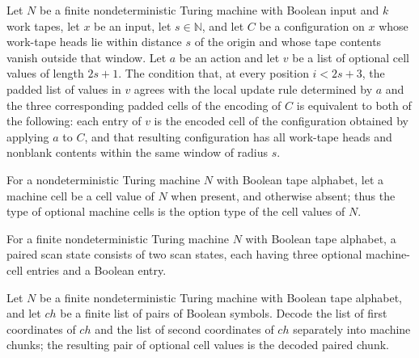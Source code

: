 \begin{theorem}
\label{Complexity.Codec.slide_step_iff}
\leanok
{}
Let $N$ be a finite nondeterministic Turing machine with Boolean input and $k$ work
tapes, let $x$ be an input, let $s\in\mathbb{N}$, and let $C$ be a configuration on $x$
whose work-tape heads lie within distance $s$ of the origin and whose tape contents
vanish outside that window. Let $a$ be an action and let $v$ be a list of optional cell
values of length $2s+1$. The condition that, at every position $i<2s+3$, the padded list
of values in $v$ agrees with the local update rule determined by $a$ and the three
corresponding padded cells of the encoding of $C$ is equivalent to both of the
following: each entry of $v$ is the encoded cell of the configuration obtained by
applying $a$ to $C$, and that resulting configuration has all work-tape heads and
nonblank contents within the same window of radius $s$.
\end{theorem}

\begin{definition}
\label{Complexity.Codec.SX}
\leanok
{}
For a nondeterministic Turing machine $N$ with Boolean tape alphabet, let a machine cell
be a cell value of $N$ when present, and otherwise absent; thus the type of optional
machine cells is the option type of the cell values of $N$.
\end{definition}

\begin{definition}
\label{Complexity.Codec.SSt}
\leanok
{}
For a finite nondeterministic Turing machine $N$ with Boolean tape alphabet, a paired
scan state consists of two scan states, each having three optional machine-cell entries
and a Boolean entry.
\end{definition}

\begin{definition}
\label{Complexity.Codec.pairChunk}
\leanok
{}
Let $N$ be a finite nondeterministic Turing machine with Boolean tape alphabet, and let
$ch$ be a finite list of pairs of Boolean symbols. Decode the list of first coordinates
of $ch$ and the list of second coordinates of $ch$ separately into machine chunks; the
resulting pair of optional cell values is the decoded paired chunk.
\end{definition}

